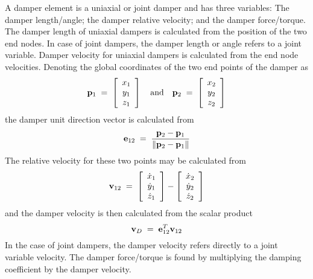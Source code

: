 {A damper element is a uniaxial or joint damper and has three variables:
The damper length/angle; the damper relative velocity;
and the damper force/torque.
The damper length of uniaxial dampers is calculated from the position of
the two end nodes.
In case of joint dampers, the damper length or angle refers to a joint variable.
Damper velocity for uniaxial dampers is calculated from the end node velocities.
Denoting the global coordinates of the two end points of the damper as
%
\begin{equation}
{\mf p}_1 \;=\;
\left[ \begin{array}{*{20}c} x_1 \\ y_1 \\ z_1 \end{array} \right]
\quad\text{and}\quad
{\mf p}_2 \;=\;
\left[ \begin{array}{*{20}c} x_2 \\ y_2 \\ z_2 \end{array} \right]
\label{eqK43:6}
\end{equation}
%
the damper unit direction vector is calculated from
%
\begin{equation}
{\bf e}_{12} \;=\; \frac{{\bf p}_2 - {\bf p}_1}{\|{\bf p}_2 - {\bf p}_1\|}
\label{eqK43:7}
\end{equation}
%
The relative velocity for these two points may be calculated from
%
\begin{equation}
{\mf v}_{12} \;=\;
\left[ \begin{array}{*{20}c}
\dot{x}_1 \\ \dot{y}_1 \\ \dot{z}_1
\end{array} \right] -
\left[ \begin{array}{*{20}c}
\dot{x}_2 \\ \dot{y}_2 \\ \dot{z}_2
\end{array} \right]
\label{eqK43:8}
\end{equation}
%
and the damper velocity is then calculated from the scalar product
%
\begin{equation}
{\bf v}_D \;=\; {\bf e}_{12}^T {\bf v}_{12}
\label{eqK43:9}
\end{equation}
%
In the case of joint dampers, the damper velocity refers directly to a joint
variable velocity.
The damper force/torque is found by multiplying the damping coefficient by the
damper velocity.

}
